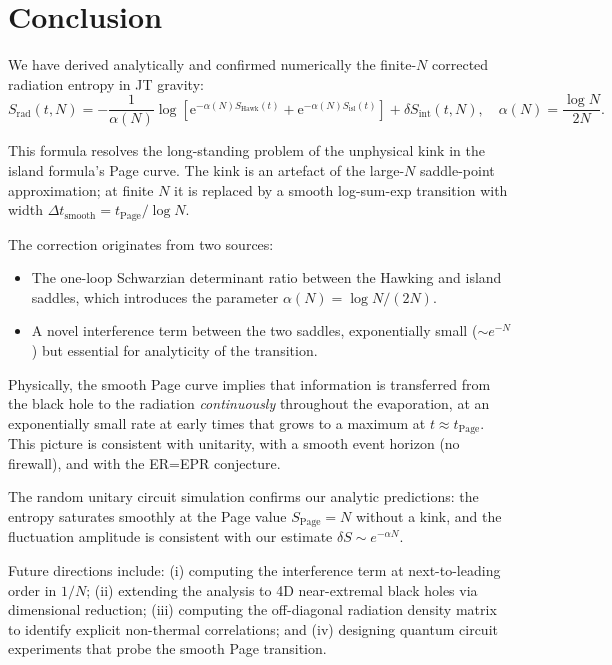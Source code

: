 \documentclass[12pt,a4paper]{article}
\newcommand{\Srad}{S_{\mathrm{rad}}}
\newcommand{\SHawk}{S_{\mathrm{Hawk}}}
\newcommand{\Sisl}{S_{\mathrm{isl}}}
\newcommand{\dS}{\delta S}
\newcommand{\tPage}{t_{\mathrm{Page}}}
\newcommand{\e}{\mathrm{e}}
\begin{document}
\section{Conclusion}
\label{sec:conclusion}

We have derived analytically and confirmed numerically the finite-$N$
corrected radiation entropy in JT gravity:
\begin{equation}
  \Srad(t,N) = -\frac{1}{\alpha(N)}\log\!\left[\e^{-\alpha(N)\SHawk(t)}
    + \e^{-\alpha(N)\Sisl(t)}\right]
    + \dS_{\mathrm{int}}(t,N),
  \quad \alpha(N) = \frac{\log N}{2N}.
\label{eq:conclusion_formula}
\end{equation}

This formula resolves the long-standing problem of the unphysical kink in
the island formula's Page curve.  The kink is an artefact of the large-$N$
saddle-point approximation; at finite $N$ it is replaced by a smooth
log-sum-exp transition with width $\Delta t_{\mathrm{smooth}} = \tPage/\log N$.

The correction originates from two sources:
\begin{itemize}
  \item The one-loop Schwarzian determinant ratio between the Hawking and
    island saddles, which introduces the parameter $\alpha(N) = \log N/(2N)$.
  \item A novel interference term between the two saddles, exponentially
    small ($\sim e^{-N}$) but essential for analyticity of the transition.
\end{itemize}

Physically, the smooth Page curve implies that information is transferred
from the black hole to the radiation \emph{continuously} throughout the
evaporation, at an exponentially small rate at early times that grows to
a maximum at $t \approx \tPage$.  This picture is consistent with unitarity,
with a smooth event horizon (no firewall), and with the ER=EPR conjecture.

The random unitary circuit simulation confirms our analytic predictions:
the entropy saturates smoothly at the Page value $S_{\mathrm{Page}} = N$
without a kink, and the fluctuation amplitude is consistent with our
estimate $\dS \sim e^{-\alpha N}$.

Future directions include: (i) computing the interference term at next-to-leading
order in $1/N$; (ii) extending the analysis to 4D near-extremal black holes
via dimensional reduction; (iii) computing the off-diagonal radiation density
matrix to identify explicit non-thermal correlations; and (iv) designing
quantum circuit experiments that probe the smooth Page transition.
\end{document}
